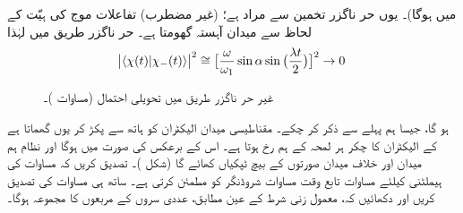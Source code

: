 میں  ہوگا)۔  یوں حر ناگزر تخمین سے مراد  ہے؛ (غیر مضطرب) تفاعلات موج کی ہیّت  کے لحاظ سے میدان آہستہ گھومتا ہے۔  حر ناگزر  طریق میں    لہٰذا 
\begin{align}
\abs{\langle \chi (t) | \chi_{-} (t) \rangle}^2 \cong \big [ \frac{\omega}{\omega_1} \sin \alpha \sin \big ( \frac{\lambda t}{2} \big ) \big ]^2 \to 0
\end{align}
%
\begin{figure}
\centering
{}
\caption{غیر حر ناگزر طریق       میں تحویلی  احتمال  (مساوات )۔}
\label{شکل_حرارت_نا_گزر_تحویلی_احتمال}
\end{figure}

ہو گا، جیسا ہم پہلے سے  ذکر کر چکے۔ مقناطیسی میدان الیکٹران کو ہاتھ سے پکڑ کر یوں گھماتا ہے کے الیکٹران کا چکر ہر لمحہ   کے ہم رخ ہوتا ہے۔  اس کے
 برعکس  کی صورت میں  ہوگا اور نظام ہم میدان اور خلاف میدان صورتوں کے بیچ ٹپکیاں کھائے گا  (شکل )۔
تصدیق کریں کہ مساوات    کی ہیملٹنی کیلئے مساوات    تابع وقت مساوات شروڈنگر کو مطمئن کرتی ہے۔ ساتھ ہی مساوات 
  کی تصدیق کریں اور دکھائیں کہ،  معمول زنی شرط کے عین مطابق،   عددی سروں کے مربعوں کا مجموعہ  ہوگا۔

